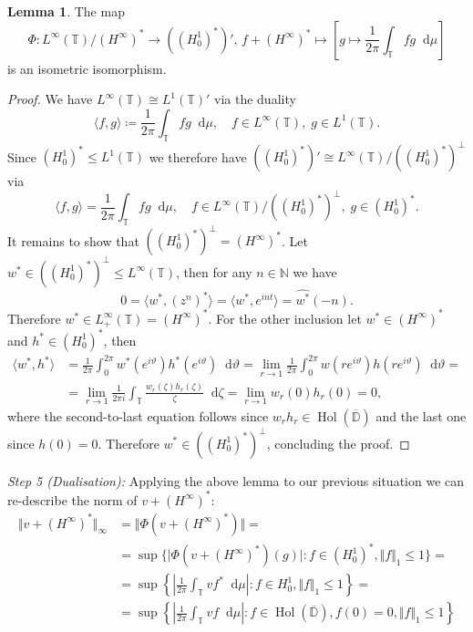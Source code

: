 \documentclass[letterpaper, 11pt]{article}
\newcommand{\D}{\mathbb{D}}
\newcommand{\T}{\mathbb{T}}
\newcommand{\N}{\mathbb{N}}
\newcommand{\1}{\mathds{1}}
\newcommand{\diff}{\mathop{}\!\mathrm{d}}
\newcommand{\cl}[1]{\overline{#1}}
\DeclareMathOperator*{\Hol}{Hol}
\theoremstyle{definition}
\newtheorem{lemma}[theorem]{Lemma}
\newenvironment{innerproof}
 {\renewcommand{\qedsymbol}{}\proof}
 {\endproof}
\begin{document}
\begin{lemma}
  The map
  \begin{equation*}
    \Phi : L^\infty(\T) / (H^\infty)^* \to ((H_0^1)^*)',\, f + (H^\infty)^* \mapsto \left[ g \mapsto \frac{1}{2 \pi} \int_\T f g \diff \mu \right]
  \end{equation*}
  is an isometric isomorphism.
\end{lemma}

\begin{proof}
  We have $L^\infty(\T) \cong L^1(\T)'$ via the duality
  $$ \langle f, g \rangle \coloneqq \frac{1}{2\pi} \int_\T f g \diff \mu, \quad f \in L^\infty(\T),\; g \in L^1(\T). $$
  Since $(H_0^1)^* \leq L^1(\T)$ we therefore have $((H_0^1)^*)' \cong L^\infty(\T) / ((H_0^1)^*)^\perp$ via
  $$ \langle f, g \rangle = \frac{1}{2\pi} \int_\T f g \diff \mu, \quad f \in L^\infty(\T) / ((H_0^1)^*)^\perp,\; g \in (H_0^1)^*. $$
  It remains to show that $((H_0^1)^*)^\perp = (H^\infty)^*$. Let $w^* \in ((H_0^1)^*)^\perp \leq L^\infty(\T)$, then for any $n \in \N$ we have
  $$ 0 = \langle w^*, (z^n)^* \rangle = \langle w^*, e^{i n t} \rangle = \widehat{w^*}(-n). $$
  Therefore $w^* \in L_+^\infty(\T) = (H^\infty)^*$. For the other inclusion let $w^* \in (H^\infty)^*$ and $h^* \in (H_0^1)^*$, then
  \begin{align*}
    \langle w^*, h^* \rangle &= \frac{1}{2\pi} \int_0^{2 \pi} w^*(e^{i \vartheta}) h^*(e^{i \vartheta}) \diff \vartheta = \lim_{r \to 1} \frac{1}{2\pi} \int_0^{2 \pi} w(r e^{i \vartheta}) h(r e^{i \vartheta}) \diff \vartheta = \\
    &= \lim_{r \to 1} \frac{1}{2\pi i} \int_\T \frac{w_r(\zeta) h_r(\zeta)}{\zeta} \diff \zeta = \lim_{r \to 1} w_r(0) h_r(0) = 0,
  \end{align*}
  where the second-to-last equation follows since $w_r h_r \in \Hol(\cl{\D})$ and the last one since $h(0) = 0$. Therefore $w^* \in ((H_0^1)^*)^\perp$, concluding the proof.
\end{proof}

\begin{innerproof}[Proof (continued)]
    \textit{Step 5 (Dualisation):} Applying the above lemma to our previous situation we can re-describe the norm of $v + (H^\infty)^*$:
    \begin{align*}
      \Vert v + (H^\infty)^* \Vert_\infty &= \Vert \Phi(v + (H^\infty)^*) \Vert = \\
      &= \sup \{ \vert \Phi(v + (H^\infty)^*)(g) \vert : f \in (H_0^1)^*, \Vert f \Vert_1 \leq 1 \} = \\
      &= \sup \left\{ \left\vert \frac{1}{2 \pi} \int_\T v f^* \diff \mu \right\vert : f \in H_0^1, \Vert f \Vert_1 \leq 1 \right\} = \\
      &= \sup \left\{ \left\vert \frac{1}{2 \pi} \int_\T v f \diff \mu \right\vert : f \in \Hol(\cl{\D}), f(0) = 0, \Vert f \Vert_1 \leq 1 \right\}
    \end{align*}
\end{innerproof}
\end{document}

